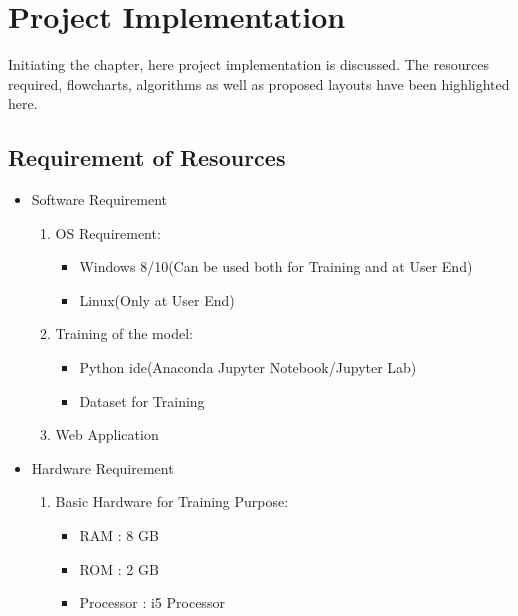 \chapter{Project Implementation}
Initiating the chapter, here project implementation is discussed. The resources required, flowcharts, algorithms as well as proposed layouts have been highlighted here.
\section{Requirement of Resources}
\begin{itemize}
    \item Software Requirement 
        \begin{enumerate}
            \item OS Requirement:
                \begin{itemize}
                    \item Windows 8/10(Can be used both for Training and at User End)
                    \item Linux(Only at User End)
                \end{itemize}
            \item Training of the model:
                \begin{itemize}
                    \item Python ide(Anaconda Jupyter Notebook/Jupyter Lab)
                    \item Dataset for Training
                \end{itemize} 
            \item Web Application
        \end{enumerate}
    \item Hardware Requirement
        \begin{enumerate}
            \item Basic Hardware for Training Purpose:
                \begin{itemize}
                    \item RAM : 8 GB
                    \item ROM : 2 GB
                    \item Processor : i5 Processor
                \end{itemize}
        \end{enumerate}
    \end{itemize}





